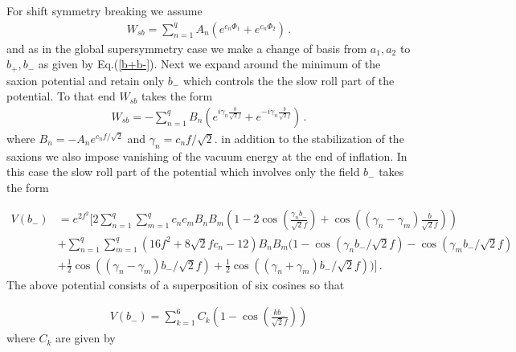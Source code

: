 \documentclass[12pt]{article}
\begin{document}
For shift symmetry breaking we assume
\begin{align}
  W_{sb} = \sum_{n=1}^q A_n \left ( e^{c_n\Phi_1} + e^{c_n\Phi_2}\right)\,.
\end{align}
and as in the global supersymmetry case we make a change of basis from $a_1, a_2$ to $b_+, b_-$ as given by
Eq.(\ref{b+b-}).
Next we expand around the minimum of the saxion potential and retain only $b_-$ which controls the
the slow roll part of the potential. To that end
$W_{sb}$ takes the form
\begin{align}
  W_{sb}= -\sum_{n=1}^q B_n (e^{i\gamma_n\frac{b}{\sqrt 2 f}} + e^{-i\gamma_n \frac{b}{\sqrt 2f}})\,.
\end{align}
where $B_n= - A_n e^{c_n f/\sqrt 2}$ and $\gamma_n = c_n f/\sqrt 2$.
in addition to the stabilization of the saxions we also impose vanishing of the vacuum energy
at the end of inflation. In this case the slow roll part of the potential which involves only the field $b_-$ takes the form

\begin{align}
  V(b_-) & =
  e^{2f^2}\Big[
    2\sum_{n=1}^q\sum_{m=1}^q c_nc_mB_nB_m \left(1- 2 \cos(\frac{\gamma_n b_-}{\sqrt 2 f}) + \cos((\gamma_n-\gamma_m) \frac{b}{\sqrt 2 f})\right)\nonumber\\
         & + \sum_{n=1}^q\sum_{m=1}^q
    (16 f^2 + 8 \sqrt 2 f c_n -12)B_nB_m
    \Big(1- \cos(\gamma_n b_-/ \sqrt 2f)- \cos(\gamma_m b_-/ \sqrt 2f) \nonumber\\
         & +\frac{1}{2} \cos((\gamma_n-\gamma_m) b_-/ \sqrt 2f)+ \frac{1}{2} \cos((\gamma_n+\gamma_m) b_-/ \sqrt 2f)
    \Big)
    \Big]\,.
  \label{sugrapot}
\end{align}
The above potential consists of a superposition of six cosines so that

\begin{align}
  V(b_-)= \sum_{k=1}^{6} C_k \left(1-\cos(\frac{kb_-}{\sqrt 2 f})\right)
\end{align}
where $C_k$ are given by
\end{document}
